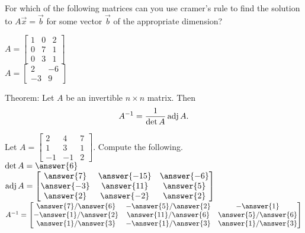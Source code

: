 \documentclass{ximera}
\newcommand{\adj}{\mathop{\rm adj}}
\begin{document}
        \begin{question} For which of the following matrices can you use cramer's rule to find the solution to $A\vec{x} = \vec{b}$ for some vector $\vec{b}$ of the appropriate dimension? 
        	
        	\begin{multipleChoice}
       	\choice[correct] $A = \begin{bmatrix} 1 &0 &2\\ 0&7& 1 \\0&3&1\end{bmatrix}$ \vspace{5pt}\\
       	\choice $A = \begin{bmatrix} 2 &-6\\ -3& 9\end{bmatrix}$ \vspace{5pt}\\	
       	  		\end{multipleChoice}
       	  		
       	  		
       	  		
       	  	\end{question}	
          \begin{question} Theorem: Let $A$ be an invertible $n\times n$ matrix. Then $$A^{-1} = \dfrac{1}{\det A}  \adj  A.$$
          	
          Let $A = \begin{bmatrix} 2& 4& 7\\ 1& 3&1\\ -1&-1&2\end{bmatrix}$. Compute the following.\vspace{10pt}\\
          
          $\det A = \answer{6}$\vspace{10pt}\\
          
          $\adj A = \begin{bmatrix} 
          \answer{7} & \answer{-15} &\answer{-6}\\
          \answer{-3} & \answer{11} &\answer{5}\\
          \answer{2} & \answer{-2} &\answer{2} \end{bmatrix}$\vspace{10pt}\\
          
      
          
          $A^{-1} =   \begin{bmatrix} 
          	\answer{7}/\answer{6} & -\answer{5}/\answer{2} &-\answer{1}\\
          	-\answer{1} /\answer{2}& \answer{11}/\answer{6} &\answer{5}/\answer{6}\\
          	\answer{1}/\answer{3} & -\answer{1}/\answer{3} &\answer{1}/\answer{3} \end{bmatrix}$
          	
          	
          \end{question}	
  
\end{document}
